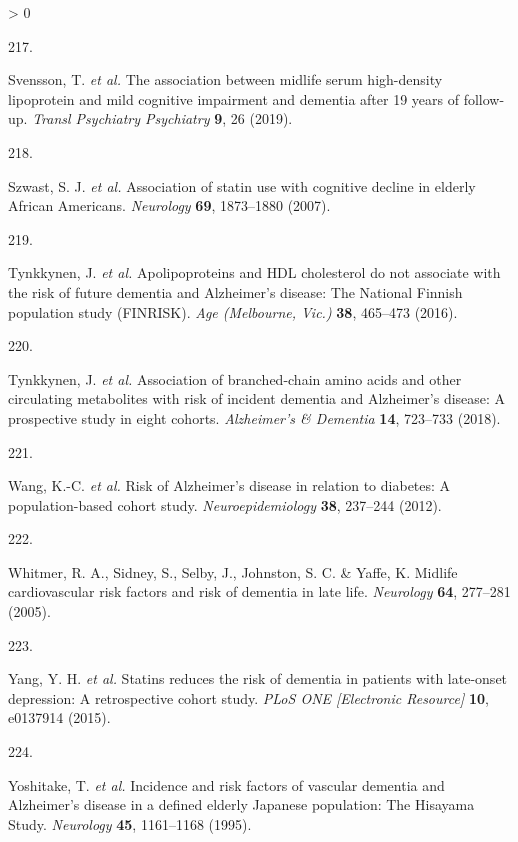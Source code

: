 \documentclass[a4paper, twoside]{templates/ociamthesis}
\newlength{\cslhangindent}
\newlength{\csllabelwidth}
\newenvironment{CSLReferences}[3] %
 {%
  \setlength{\parindent}{0pt}
  \ifodd #1 \everypar{\setlength{\hangindent}{\cslhangindent}}\ignorespaces\fi
  \ifnum #2 > 0
  \setlength{\parskip}{#2\baselineskip}
  \fi
 }%
 {}
\newcommand{\CSLLeftMargin}[1]{\parbox[t]{\maxof{\widthof{#1}}{\csllabelwidth}}{#1}}
\newcommand{\CSLRightInline}[1]{\parbox[t]{\linewidth - \csllabelwidth}{#1}}
\begin{document}
\begin{CSLReferences}{0}{0}
\leavevmode\hypertarget{ref-svensson2019}{}%
\CSLLeftMargin{217. }
\CSLRightInline{Svensson, T. \emph{et al.} The association between midlife serum high-density lipoprotein and mild cognitive impairment and dementia after 19 years of follow-up. \emph{Transl Psychiatry Psychiatry} \textbf{9}, 26 (2019).}

\leavevmode\hypertarget{ref-szwast2007}{}%
\CSLLeftMargin{218. }
\CSLRightInline{Szwast, S. J. \emph{et al.} Association of statin use with cognitive decline in elderly {African Americans}. \emph{Neurology} \textbf{69}, 1873--1880 (2007).}

\leavevmode\hypertarget{ref-tynkkynen2016}{}%
\CSLLeftMargin{219. }
\CSLRightInline{Tynkkynen, J. \emph{et al.} Apolipoproteins and {HDL} cholesterol do not associate with the risk of future dementia and {Alzheimer}'s disease: The {National Finnish} population study ({FINRISK}). \emph{Age (Melbourne, Vic.)} \textbf{38}, 465--473 (2016).}

\leavevmode\hypertarget{ref-tynkkynen2018}{}%
\CSLLeftMargin{220. }
\CSLRightInline{Tynkkynen, J. \emph{et al.} Association of branched-chain amino acids and other circulating metabolites with risk of incident dementia and {Alzheimer}'s disease: {A} prospective study in eight cohorts. \emph{Alzheimer's \& Dementia} \textbf{14}, 723--733 (2018).}

\leavevmode\hypertarget{ref-wang2012}{}%
\CSLLeftMargin{221. }
\CSLRightInline{Wang, K.-C. \emph{et al.} Risk of {Alzheimer}'s disease in relation to diabetes: A population-based cohort study. \emph{Neuroepidemiology} \textbf{38}, 237--244 (2012).}

\leavevmode\hypertarget{ref-whitmer2005a}{}%
\CSLLeftMargin{222. }
\CSLRightInline{Whitmer, R. A., Sidney, S., Selby, J., Johnston, S. C. \& Yaffe, K. Midlife cardiovascular risk factors and risk of dementia in late life. \emph{Neurology} \textbf{64}, 277--281 (2005).}

\leavevmode\hypertarget{ref-yang2015}{}%
\CSLLeftMargin{223. }
\CSLRightInline{Yang, Y. H. \emph{et al.} Statins reduces the risk of dementia in patients with late-onset depression: {A} retrospective cohort study. \emph{PLoS ONE {[}Electronic Resource{]}} \textbf{10}, e0137914 (2015).}

\leavevmode\hypertarget{ref-yoshitake1995}{}%
\CSLLeftMargin{224. }
\CSLRightInline{Yoshitake, T. \emph{et al.} Incidence and risk factors of vascular dementia and {Alzheimer}'s disease in a defined elderly {Japanese} population: The {Hisayama Study}. \emph{Neurology} \textbf{45}, 1161--1168 (1995).}


\end{CSLReferences}
\end{document}
